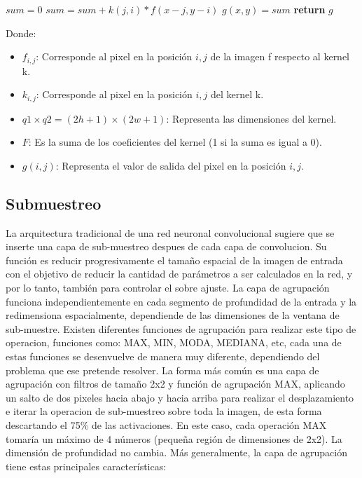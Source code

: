 \begin{itemize}
{\begin{algorithm}
\begin{algorithmic}[H]

  \State $sum=0$
           \State $sum=sum + k(j,i)*f(x-j,y-i)$
		\EndFor
	 \EndFor 
  \State $g(x,y)=sum$
\EndFor
\EndFor
\State \textbf{return} $g$
\EndProcedure
\end{algorithmic}
\end{algorithm}

Donde:
\begin{itemize}
\item $f_{i,j}$: Corresponde al pixel en la posición $i,j$ de la imagen f respecto al kernel k.
\item $k_{i,j}$: Corresponde al pixel en la posición $i,j$ del kernel k.
\item $q1\times q2 = (2h+1)\times(2w+1)$: Representa las dimensiones del kernel.
\item $F$: Es la suma de los coeficientes del kernel (1 si la suma es igual a 0).
\item $g(i,j)$: Representa el valor de salida del pixel en la posición $i,j$.
\end{itemize}}

\end{itemize}

\subsection{Submuestreo}
La arquitectura tradicional de una red neuronal convolucional sugiere que se inserte una capa de sub-muestreo despues de cada capa de convolucion. Su función es reducir progresivamente el tamaño espacial de la imagen de entrada con el objetivo de reducir la cantidad de parámetros a ser calculados en la red, y por lo tanto, también para controlar el sobre ajuste. La capa de agrupación funciona independientemente en cada segmento de profundidad de la entrada y la redimensiona espacialmente, dependiende de las dimensiones de la ventana de sub-muestre. Existen diferentes funciones de agrupación para realizar este tipo de operacion, funciones como: MAX, MIN, MODA, MEDIANA, etc, cada una de estas funciones se desenvuelve de manera muy diferente, dependiendo del problema que ese pretende resolver. La forma más común es una capa de agrupación con filtros de tamaño 2x2 y función de agrupación MAX, aplicando un salto de dos pixeles hacia abajo y hacia arriba para realizar el desplazamiento e iterar la operacion de sub-muestreo sobre toda la imagen, de esta forma descartando el 75\% de las activaciones. En este caso, cada operación MAX tomaría un máximo de 4 números (pequeña región de dimensiones de 2x2). La dimensión de profundidad no cambia. Más generalmente, la capa de agrupación tiene estas principales características:

